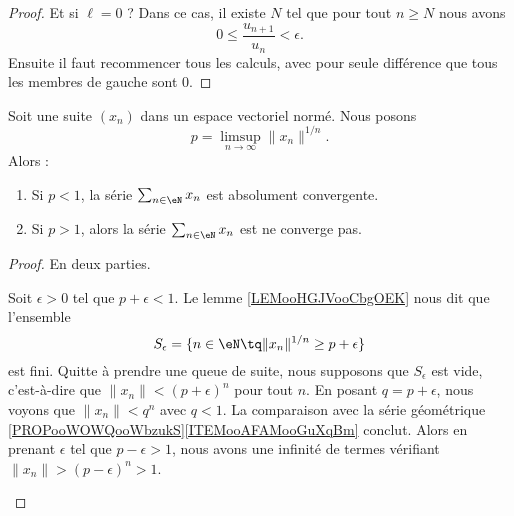 \begin{proof}
	Et si \( \ell=0\) ? Dans ce cas, il existe \( N\) tel que pour tout \( n\geq N\) nous avons
	\begin{equation}
		0\leq \frac{ u_{n+1} }{ u_n }<\epsilon.
	\end{equation}
	Ensuite il faut recommencer tous les calculs, avec pour seule différence que tous les membres de gauche sont \( 0\).
\end{proof}


\begin{lemma}        \label{LEMooDWNZooXwejrF}
	Soit une suite \( (x_n)\) dans un espace vectoriel normé. Nous posons
	\begin{equation}
		p=\limsup_{n\to \infty}\| x_n \|^{1/n}.
	\end{equation}
	Alors :
	\begin{enumerate}
		\item       \label{ITEMooZZBIooUYrtYL}
		      Si \( p<1\), la série \( \sum_{n\in \eN}x_n\) est absolument convergente.
		\item       \label{ITEMooQGKNooOFeFRd}
		      Si \( p>1\), alors la série \( \sum_{n\in \eN}x_n\) est ne converge pas.
	\end{enumerate}
\end{lemma}

\begin{proof}
	En deux parties.
	\begin{subproof}
		Soit \( \epsilon>0\) tel que \( p+\epsilon<1\). Le lemme \ref{LEMooHGJVooCbgOEK} nous dit que l'ensemble
		\begin{equation}
			S_{\epsilon}=\{ n\in \eN\tq \| x_n \|^{1/n}\geq p+\epsilon \}
		\end{equation}
		est fini. Quitte à prendre une queue de suite, nous supposons que \( S_{\epsilon}\) est vide, c'est-à-dire que \( \| x_n \|<(p+\epsilon)^n\) pour tout \( n\). En posant \( q=p+\epsilon\), nous voyons que \( \| x_n \|<q^n\) avec \( q<1\). La comparaison avec la série géométrique \ref{PROPooWOWQooWbzukS}\ref{ITEMooAFAMooGuXqBm} conclut.
		Alors en prenant \( \epsilon\) tel que \( p-\epsilon>1\), nous avons une infinité de termes vérifiant \( \| x_n \|>(p-\epsilon)^n>1\).
	\end{subproof}
\end{proof}

